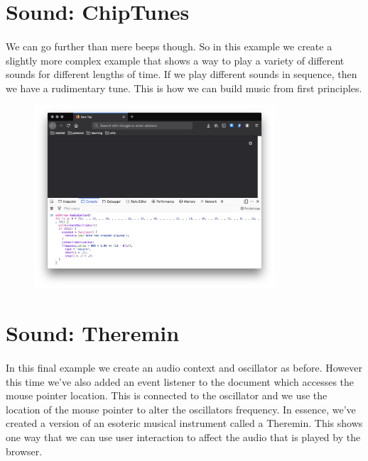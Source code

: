 \section{Sound: ChipTunes}

\paragraph{} We can go further than mere beeps though. So in this example we create a slightly more complex example that shows a way to play a variety of different sounds for different lengths of time. If we play different sounds in sequence, then we have a rudimentary tune. This is how we can build music from first principles.

\begin{figure}[H]
\centering
\includegraphics[width=0.8\textwidth]{figures/js-chiptunes}
\label{fig:js-chiptunes}
\caption{}
\end{figure}


\section{Sound: Theremin}
\paragraph{} In this final example we create an audio context and oscillator as before. However this time we've also added an event listener to the document which accesses the mouse pointer location. This is connected to the oscillator and we use the location of the mouse pointer to alter the oscillators frequency. In essence, we've created a version of an esoteric musical instrument called a Theremin. This shows one way that we can use user interaction to affect the audio that is played by the browser.

